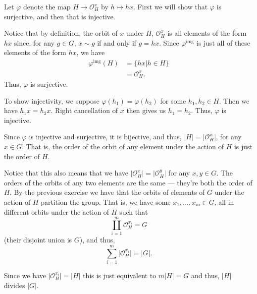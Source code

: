 \documentclass[12 pt, letterpaper]{hmcpset}
\begin{document}
\begin{solution}
	Let $\varphi$ denote the map $H \to \mathcal{O}_H^x$ by $h \mapsto hx$. First we will show that $\varphi$ is surjective, and then that is injective. 

	Notice that by definition, the orbit of $x$ under $H$, $\mathcal{O}_H^x$ is all elements of the form $hx$ since, for any $g \in G$, $x \sim g$ if and only if $g = h x$. Since $\varphi^\text{img}$ is just all of these elements of the form $hx$, we have
	\[
		\begin{split}
			\varphi^\text{img}(H) & = \{ hx | h \in H \} \\
					      & = \mathcal{O}_H^x.
		\end{split}
	\]
	Thus, $\varphi$ is surjective. 

	To show injectivity, we suppose $\varphi(h_1) = \varphi(h_2)$ for some $h_1, h_2 \in H$. Then we have $h_1 x = h_2 x$. Right cancellation of $x$ then gives us $h_1 = h_2$. Thus, $\varphi$ is injective. 

	Since $\varphi$ is injective and surjective, it is bijective, and thus, $\lvert H \rvert = \lvert \mathcal{O}_H^x \rvert$, for any $x \in G$. That is, the order of the orbit of any element under the action of $H$ is just the order of $H$. 

	Notice that this also means that we have $\lvert \mathcal{O}_H^x \rvert = \lvert \mathcal{O}_H^y \rvert$ for any $x, y \in G$. The orders of the orbits of any two elements are the same --- they're both the order of $H$. By the previous exercise we have that the orbits of elements of $G$ under the action of $H$ partition the group. That is, we have some $x_1, \dots, x_m \in G$, all in different orbits under the action of $H$ such that
	\[
		\coprod_{i = 1}^m \mathcal{O}_H^{x_i} = G 
	\]
	(their disjoint union is $G$), and thus,
	\[
		\sum_{i = 1}^m \lvert \mathcal{O}_H^{x_i} \rvert = \lvert G \rvert.
	\] 

	Since we have $\lvert \mathcal{O}_H^{x_i} \rvert = \lvert H \rvert$ this is just equivalent to $m \lvert H \rvert = G$ and thus, $\lvert H \rvert$ divides $\lvert G \rvert$.
\end{solution}

\pagebreak
\end{document}
